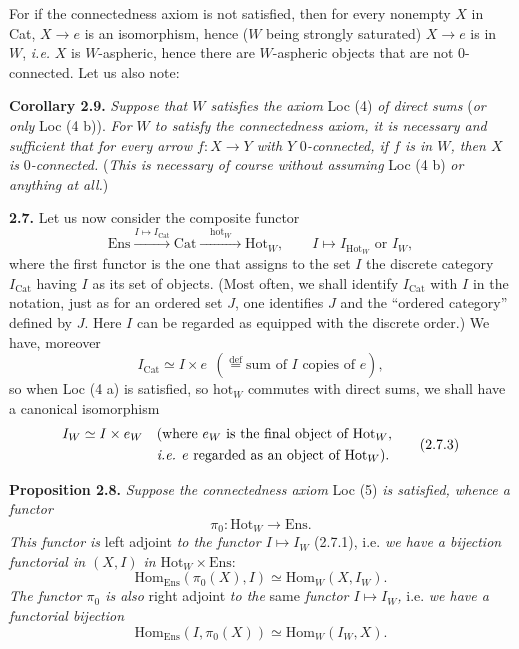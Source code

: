 \documentclass[11pt]{article}
\newcommand{\printedpage}[1]{\marginpar{\footnotesize p.~#1}}
\newcommand{\msp}[1]{\marginpar{\footnotesize [#1]}}
\begin{document}
For if the connectedness axiom is not satisfied, then for every nonempty $X$ in Cat, $X \longrightarrow e$ is an isomorphism, hence ($W$ being strongly saturated) $X \longrightarrow e$ is in $W$, \textit{i.e.} $X$ is $W$-aspheric, hence there are $W$-aspheric objects that are not 0-connected. Let us also note: %

\textbf{Corollary 2.9.} \textit{Suppose that $W$ satisfies the axiom} Loc (4) \textit{of direct sums} (\textit{or only} Loc (4 b)). \textit{For $W$ to satisfy the connectedness axiom, it is necessary and sufficient that for every arrow $f : X \longrightarrow Y$ with $Y$} 0\textit{-connected, if $f$ is in $W$, then $X$ is} 0\textit{-connected.} (\textit{This is necessary of course without assuming} Loc (4 b) \textit{or anything at all.})

\msp{page 14}

\textbf{2.7.} Let us now consider the composite functor
\[
\mathrm{Ens} \xrightarrow{I \longmapsto I_{\mathrm{Cat}}} \mathrm{Cat} \xrightarrow{\quad \mathrm{hot}_W \quad} \mathrm{Hot}_W, \qquad I \longmapsto I_{\mathrm{Hot}_W} \text{ or } I_W, \tag*{(2.7.1)}
\]
where the first functor is the one that assigns to the set $I$ the discrete category $I_{\mathrm{Cat}}$ having $I$ as its set of objects. (Most often, we shall identify $I_{\mathrm{Cat}}$ with $I$ in the notation, just as for an ordered set $J$, one identifies $J$ and the ``ordered category'' %
defined by $J$. Here $I$ can be regarded as equipped with the discrete order.) We have, moreover
\[
I_{\mathrm{Cat}} \simeq I \times e \ \ (\overset{\text{def}}{=} \text{sum of $I$ copies of $e$}), \tag*{(2.7.2)}
\]
so when Loc (4 a) is satisfied, so $\mathrm{hot}_W$ commutes with direct sums, we shall have a canonical isomorphism
\[
\begin{aligned}
I_W \simeq I \times e_W \quad &\text{(where $e_W$ is the final object of $\mathrm{Hot}_W$,} \\
&\text{\textit{i.e.} $e$ regarded as an object of $\mathrm{Hot}_W$).}
\end{aligned} \tag*{(2.7.3)}
\]

\printedpage{8}
\textbf{Proposition 2.8.} \textit{Suppose the connectedness axiom} Loc (5) \textit{is satisfied, whence a functor}
\[
\pi_0 : \mathrm{Hot}_W \longrightarrow \mathrm{Ens}. \tag*{(2.8.1)}
\]
\textit{This functor is} left adjoint \textit{to the functor $I \longmapsto I_W$} (2.7.1), i.e. \textit{we have a bijection functorial in $(X, I)$ in} $\mathrm{Hot}_W \times \mathrm{Ens}$:
\msp{page 15}
\[
\mathrm{Hom}_{\mathrm{Ens}}(\pi_0(X), I) \simeq \mathrm{Hom}_W(X, I_W). \tag*{(2.8.2)}
\]
\textit{The functor $\pi_0$ is also} right adjoint \textit{to the} same \textit{functor $I \longmapsto I_W$,} i.e. \textit{we have a functorial bijection} %
\[
\mathrm{Hom}_{\mathrm{Ens}}(I, \pi_0(X)) \simeq \mathrm{Hom}_W(I_W, X). \tag*{(2.8.3)}
\]
\end{document}
